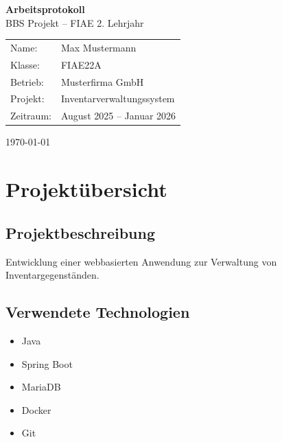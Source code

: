 \documentclass[
    12pt,
    a4paper
]{article}
\begin{document}
\begin{titlepage}

    \centering

    \vspace*{3cm}

    {\Huge\textbf{Arbeitsprotokoll}}\\[1cm]

    {\Large BBS Projekt – FIAE 2. Lehrjahr}\\[2cm]

    \begin{tabular}{ll}
        Name: & Max Mustermann \\
        Klasse: & FIAE22A \\
        Betrieb: & Musterfirma GmbH \\
        Projekt: & Inventarverwaltungssystem \\
        Zeitraum: & August 2025 -- Januar 2026 \\
    \end{tabular}

    \vfill

    {\large \today}

\end{titlepage}

\tableofcontents

\newpage

\section{Projektübersicht}

\subsection{Projektbeschreibung}

Entwicklung einer webbasierten Anwendung zur Verwaltung
von Inventargegenständen.

\subsection{Verwendete Technologien}

\begin{itemize}
    \item Java
    \item Spring Boot
    \item MariaDB
    \item Docker
    \item Git
\end{itemize}
\end{document}
